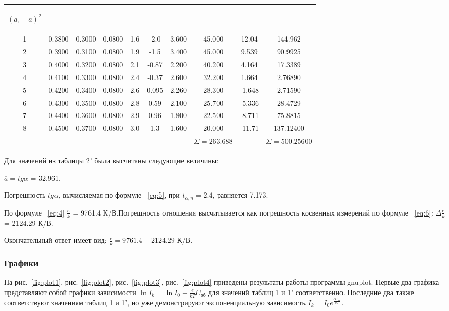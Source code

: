 \begin{center}
\begin{table}[H]
\begin{tabular}{|c|c|c|c|c|c|c|c|c|c|}
\begin{minipage}{20mm}
     \begin{center} $(a_{\text{i}}-\overline{a})^2$ \end{center}
\end{minipage}\\
\hline
1 & 0.3800 & 0.3000 & 0.0800 & 1.6 & -2.0  & 3.600 & 45.000 & 12.04  & 144.962   \\
2 & 0.3900 & 0.3100 & 0.0800 & 1.9 & -1.5  & 3.400 & 45.000 & 9.539  & 90.9925   \\
3 & 0.4000 & 0.3200 & 0.0800 & 2.1 & -0.87 & 2.200 & 40.200 & 4.164  & 17.3389   \\
4 & 0.4100 & 0.3300 & 0.0800 & 2.4 & -0.37 & 2.600 & 32.200 & 1.664  & 2.76890   \\
5 & 0.4200 & 0.3400 & 0.0800 & 2.6 & 0.095 & 2.260 & 28.300 & -1.648 & 2.71590   \\
6 & 0.4300 & 0.3500 & 0.0800 & 2.8 & 0.59  & 2.100 & 25.700 & -5.336 & 28.4729   \\
7 & 0.4400 & 0.3600 & 0.0800 & 2.9 & 0.96  & 1.800 & 22.500 & -8.711 & 75.8815   \\
8 & 0.4500 & 0.3700 & 0.0800 & 3.0 & 1.3   & 1.600 & 20.000 & -11.71 & 137.12400 \\
\hline
 & & & & & & & $\Sigma=263.688$ & & $\Sigma=500.25600$ \\
\hline
\end{tabular}
\end{table}
\end{center}

Для значений из таблицы \hyperref[tabl:4]{2'} были высчитаны следующие величины:

$\overline{a}=tg{\alpha}$ = 32.961.

Погрешность $tg{\alpha}$, вычисляемая по формуле ~\ref{eq:5}, при $t_{\alpha,n}=2.4$, равняется 7.173.

По формуле ~\ref{eq:4} $\frac{e}{k}$ = 9761.4 К/В.Погрешность отношения высчитывается как погрешность косвенных измерений по формуле ~\ref{eq:6}: $\Delta\frac{e}{k}$ = 2124.29 К/В.

Окончательный ответ имеет вид: $\frac{e}{k} = 9761.4 \pm2124.29$ К/В.

\subsubsection{Графики}

На рис.~\ref{fig:plot1}, рис.~\ref{fig:plot2}, рис.~\ref{fig:plot3}, рис.~\ref{fig:plot4} приведены результаты работы программы gnuplot. Первые два графика представляют собой графики зависимости $\ln I_k = \ln I_0 + \frac{e}{kT}U_{\text{эб}}$ для значений таблиц \hyperref[tabl:2]{1} и \hyperref[tabl:2]{1'} соответственно. Последние два также соответствуют значениям таблиц \hyperref[tabl:2]{1} и \hyperref[tabl:2]{1'}, но уже демонстрируют экспоненциальную зависимость $I_k = I_0e^{\frac{eU_{\text{эб}}}{kT}}$.

